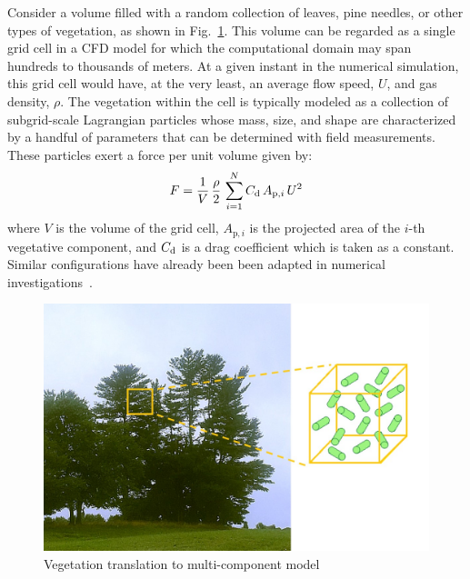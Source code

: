 \documentclass[12pt]{article}
\begin{document}
Consider a volume filled with a random collection of leaves, pine needles, or other types of vegetation, as shown in Fig.~\ref{fig:Canopymod}. This volume can be regarded as a single grid cell in a CFD model for which the computational domain may span hundreds to thousands of meters. At a given instant in the numerical simulation, this grid cell would have, at the very least, an average flow speed, $U$, and gas density, $\rho$.  The vegetation within the cell is typically modeled as a collection of subgrid-scale Lagrangian particles whose mass, size, and shape are characterized by a handful of parameters that can be determined with field measurements. These particles exert a force per unit volume given by:
\begin{equation}
\label{eq:DragForce}
F = \frac{1}{V} \, \frac{\rho}{2} \, \sum_{i=1}^N  C_{\rm d} \, A_{\mathrm{p},i} \, {U}^2
\end{equation}
where $V$ is the volume of the grid cell, $A_{\mathrm{p},i}$ is the projected area of the $i$-th vegetative component, and $C_{\rm d}$ is a drag coefficient which is taken as a constant. Similar configurations have already been been adapted in numerical investigations~\cite{Pimont2009, Dupont2008}.
\begin{figure}[!ht]
	\centering 	\includegraphics[width=1.0\linewidth]{Picture1.jpg}
	\caption{Vegetation translation to multi-component model}
	\label{fig:Canopymod}
\end{figure}
\end{document}
